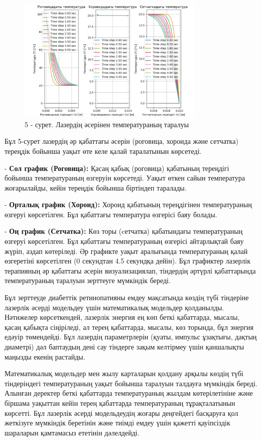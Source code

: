 \begin{figure}[H]
	\centering
	\includegraphics[width=0.8\textwidth]{media/ict/image24}
	\caption*{5 - сурет. Лазердің әсерінен температураның таралуы}
\end{figure}

\begin{multicols}{2}
Бұл 5-сурет лазердің әр қабаттағы әсерін (роговица, хороида және
сетчатка) тереңдік бойынша уақыт өте келе қалай таралатынын көрсетеді.

- {\bfseries Сол график (Роговица):} Қасаң қабық (роговица) қабатының
тереңдігі бойынша температураның өзгеруін көрсетеді. Уақыт өткен сайын
температура жоғарылайды, кейін тереңдік бойынша біртіндеп таралады.

- {\bfseries Орталық график (Хороид):} Хороид қабатының тереңдігінен
температураның өзгеруі көрсетілген. Бұл қабаттағы температура өзгерісі
баяу болады.

- {\bfseries Оң график (Сетчатка):} Көз торы (cетчатка) қабатындағы
температураның өзгеруі көрсетілген. Бұл қабаттағы температураның
өзгерісі айтарлықтай баяу жүріп, аздап көтеріледі.
Әр графикте уақыт аралығында температураның қалай өзгеретіні көрсетілген
(0 секундтан 4.5 секундқа дейін). Бұл графиктер лазерлік терапияның әр
қабаттағы әсерін визуализациялап, тіндердің әртүрлі қабаттарында
температураның таралуын зерттеуге мүмкіндік береді.

Бұл зерттеуде диабеттік ретинопатияны емдеу мақсатында көздің түбі
тіндеріне лазерлік әсерді модельдеу үшін математикалық модельдер
қолданылды. Нәтижелер көрсеткендей, лазерлік энергия ең көп беткі
қабаттарда, мысалы, қасаң қабықта сіңіріледі, ал терең қабаттарда,
мысалы, көз торында, бұл энергия едәуір төмендейді. Бұл лазердің
параметрлерін (қуаты, импульс ұзақтығы, дақтың диаметрі) дәл баптаудың
дені сау тіндерге зақым келтірмеу үшін қаншалықты маңызды екенің
растайды.

Математикалық модельдер мен жылу карталарын қолдану арқылы көздің түбі
тіндеріндегі температураның уақыт бойынша таралуын талдауға мүмкіндік
береді. Алынған деректер беткі қабаттарда температураның жылдам
көтерілетініне және біршама уақыттан кейін терең қабаттарда
температураның тұрақталатынын көрсетті. Бұл лазерлік әсерді модельдеудің
жоғары деңгейдегі басқаруға қол жеткізуге мүмкіндік беретінін және
тиімді емдеу үшін қажетті қауіпсіздік шараларын қамтамасыз ететінін
дәлелдейді.
\end{multicols}

